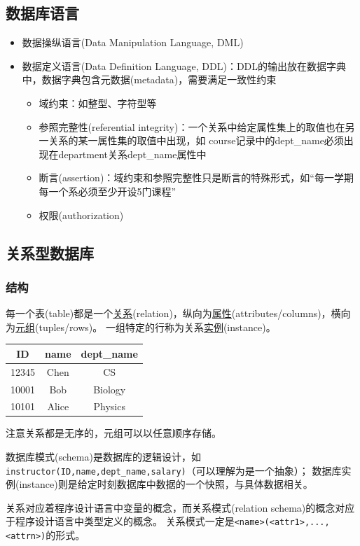 \subsection{数据库语言}
\begin{itemize}
\item 数据操纵语言(Data Manipulation Language, DML)
\item 数据定义语言(Data Definition Language, DDL)：DDL的输出放在数据字典中，数据字典包含元数据(metadata)，需要满足一致性约束
\begin{itemize}
	\item 域约束：如整型、字符型等
	\item 参照完整性(referential integrity)：一个关系中给定属性集上的取值也在另一关系的某一属性集的取值中出现，如
	course记录中的dept\_name必须出现在department关系dept\_name属性中
	\item 断言(assertion)：域约束和参照完整性只是断言的特殊形式，如“每一学期每一个系必须至少开设5门课程”
	\item 权限(authorization)
\end{itemize}
\end{itemize}

\subsection{关系型数据库}
\subsubsection{结构}
每一个表(table)都是一个\underline{关系}(relation)，纵向为\underline{属性}(attributes/columns)，横向为\underline{元组}(tuples/rows)。
一组特定的行称为关系\underline{实例}(instance)。
\begin{center}
\begin{tabular}{|c|c|c|}\hline
\textbf{ID} & \textbf{name} & \textbf{dept\_name}\\\hline
12345 & Chen & CS\\
10001 & Bob & Biology\\
10101 & Alice & Physics\\\hline
\end{tabular}
\end{center}
注意关系都是无序的，元组可以以任意顺序存储。

数据库模式(schema)是数据库的逻辑设计，如\verb'instructor(ID,name,dept_name,salary)'（可以理解为是一个抽象）；
数据库实例(instance)则是给定时刻数据库中数据的一个快照，与具体数据相关。

关系对应着程序设计语言中变量的概念，而关系模式(relation schema)的概念对应于程序设计语言中类型定义的概念。
关系模式一定是\verb'<name>(<attr1>,...,<attrn>)'的形式。

